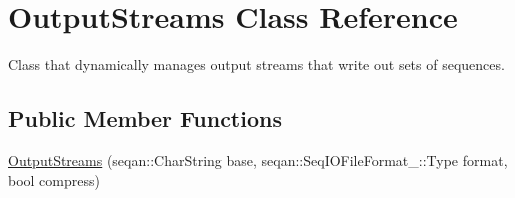 \hypertarget{class_output_streams}{\section{Output\-Streams Class Reference}
\label{class_output_streams}
}


Class that dynamically manages output streams that write out sets of sequences.  


\subsection*{Public Member Functions}
\begin{DoxyCompactItemize}
\item 
\hypertarget{class_output_streams_a224ac9f0321f3552b6874554e63683d7}{\hyperlink{class_output_streams_a224ac9f0321f3552b6874554e63683d7}{Output\-Streams} (seqan\-::\-Char\-String base, seqan\-::\-Seq\-I\-O\-File\-Format\-\_\-\-::\-Type format, bool compress)}\label{class_output_streams_a224ac9f0321f3552b6874554e63683d7}


\end{DoxyCompactItemize}
